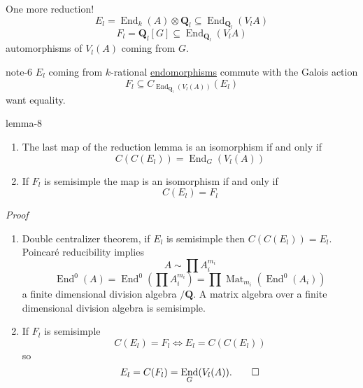\documentclass[10pt,]{book}
\makeatletter
\renewcommand*{\proofname}{Proof}
\renewenvironment{proof}[1][\proofname]{\par
  \pushQED{\qed}%
  \normalfont \topsep6\p@\@plus6\p@\relax
  \trivlist
  \item\relax
    {\itshape
    #1\@addpunct{.}}\hspace\labelsep\ignorespaces
}{%
  \popQED\endtrivlist\@endpefalse
}
\numberwithin{equation}{section}
\newcommand{\QQ}{\mathbf{Q}}
\DeclareMathOperator{\End}{End}
\DeclareMathOperator{\Mat}{Mat}
\makeatother
\begin{document}
\hypertarget{p-387}{}%
One more reduction!%
\begin{equation*}
E_l = \End_k(A) \otimes \QQ_l\subseteq \End_{\QQ_l} (V_lA)
\end{equation*}
%
\begin{equation*}
F_l = \QQ_l[G] \subseteq \End_{\QQ_l} (V_lA)
\end{equation*}
automorphisms of \(V_l(A) \) coming from \(G\).%
\begin{note}{}{note-6}%
\hypertarget{p-388}{}%
\(E_l\) coming from \(k\)-rational \hyperref[def-supersing-isog-endo]{endomorphisms} commute with the Galois action%
\begin{equation*}
F_l\subseteq C_{\End_{\QQ_l}(V_l(A))}(E_l)
\end{equation*}
want equality.%
\end{note}
\begin{lemma}{}{}{lemma-8}%
\hypertarget{p-389}{}%
\leavevmode%
\begin{enumerate}
\item\hypertarget{li-77}{}The last map of the reduction lemma is an isomorphism if and only if%
\begin{equation*}
C(C(E_l)) = \End_G(V_l(A))
\end{equation*}
%
\item\hypertarget{li-78}{}If \(F_l\) is semisimple the map is an isomorphism if and only if%
\begin{equation*}
C(E_l) = F_l
\end{equation*}
%
\end{enumerate}
%
\end{lemma}
\begin{proof}\hypertarget{proof-66}{}
\hypertarget{p-390}{}%
\leavevmode%
\begin{enumerate}
\item\hypertarget{li-79}{}Double centralizer theorem, if \(E_l\) is semisimple then \(C(C(E_l))= E_l\). Poincaré reducibility implies%
\begin{equation*}
A\sim \prod A_i^{m_i}
\end{equation*}
%
\begin{equation*}
\End^0(A) = \End^0(\prod A_i^{m_i}) = \prod \Mat_{m_i}(\End^0(A_i))
\end{equation*}
a finite dimensional division algebra \(/\QQ\). A matrix algebra over a finite dimensional division algebra is semisimple.%
\item\hypertarget{li-80}{}If \(F_l\) is semisimple%
\begin{equation*}
C(E_l) = F_l \iff E_l = C(C(E_l))
\end{equation*}
so%
\begin{equation*}
E_l = C(F_l) = \End_G(V_l(A))\text{.}\qedhere
\end{equation*}
%
\end{enumerate}
%
\end{proof}
%
%
\typeout{************************************************}
\typeout{************************************************}
%
\end{document}
